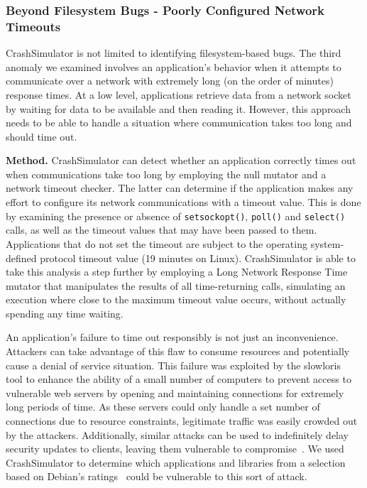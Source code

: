 \subsubsection{Beyond Filesystem Bugs - Poorly Configured Network Timeouts}
\label{sec-timeout-bugs}

CrashSimulator is not limited
to identifying filesystem-based bugs.
The third anomaly we examined
involves an application's behavior
when it attempts to communicate
over a network with extremely long
(on the order of minutes) response times.
At a low level,
applications retrieve data from a network socket
by waiting for data to be available and then reading it.
However,
this approach needs to be able to handle
a situation where communication
takes too long and should time out.

{\bf Method.}
CrashSimulator can detect
whether an application correctly times out when communications
take too long
by employing the null mutator and a network timeout checker. The latter
can determine if the application makes any effort
to configure its network communications with a timeout value.
This is done by examining the presence or absence of {\tt setsockopt()}, {\tt poll()}
and {\tt select()} calls, as well as the timeout values that may
have been passed to them. Applications that do not set the timeout are
subject to the operating system-defined protocol timeout value (19 minutes on Linux).
CrashSimulator is able to take this analysis a step further by employing a Long Network Response Time mutator
that manipulates
the results of all time-returning calls,
simulating an execution where close to the maximum timeout value occurs,
without actually spending any time waiting.

An application's failure
to time out responsibly
is not just an inconvenience. Attackers can take advantage of this flaw
to consume resources and potentially cause a denial of service situation.
This failure was exploited by the slowloris~\cite{Slowloris} tool
to enhance the ability
of a small number of computers to prevent access
to vulnerable web servers
by opening and maintaining connections
for extremely long periods of time.
As these servers could only handle a set number of connections
due to resource constraints,
legitimate traffic was easily crowded out by the attackers.
Additionally, similar attacks can be used to
indefinitely delay security updates to
clients, leaving them vulnerable to compromise~\cite{Cappos_TR_08}.
We used CrashSimulator to determine which applications and
libraries from a selection based on Debian's ratings~\cite{DebPopCon}
could be vulnerable to this sort of attack.

